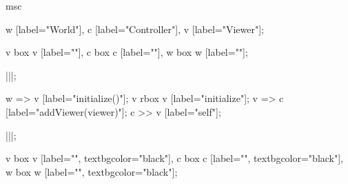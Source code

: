 \begin{msc}
msc
{

w [label="World"],
c [label="Controller"],
v [label="Viewer"];

v box v [label=""],
c box c [label=""],
w box w [label=""];

|||;

w => v [label="initialize()"];
v rbox v [label="initialize"];
v => c [label="addViewer(viewer)"];
c >> v [label="self"];

|||;

v box v [label="", textbgcolor="black"],
c box c [label="", textbgcolor="black"],
w box w [label="", textbgcolor="black"];

}
\end{msc}
